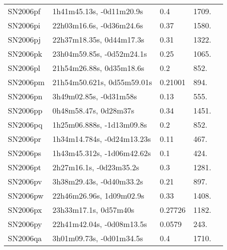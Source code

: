 \begin{longtable}{lllll}
         SN2006pf &       1h41m45.13s, -0d11m20.9s &      0.4 &          1709. &    \citet{2006IAUC.8782A...1M} \\
         SN2006pi &       22h03m16.6s, -0d36m24.6s &     0.37 &          1580. &    \citet{2006IAUC.8782A...1M} \\
         SN2006pj &       22h37m18.35s, 0d44m17.3s &     0.31 &          1322. &    \citet{2006IAUC.8782A...1M} \\
         SN2006pk &      23h04m59.85s, -0d52m24.1s &     0.25 &          1065. &    \citet{2006IAUC.8782A...1M} \\
         SN2006pl &       21h54m26.88s, 0d35m18.6s &      0.2 &           852. &    \citet{2006IAUC.8782A...1M} \\
         SN2006pm &     21h54m50.621s, 0d55m59.01s &  0.21001 &           894. &    \citet{2016SDSSD.C...0000:} \\
         SN2006pn &         3h49m02.85s, -0d31m58s &     0.13 &           555. &    \citet{2006IAUC.8782A...1M} \\
         SN2006pp &          0h48m58.47s, 0d28m37s &     0.34 &          1451. &    \citet{2006IAUC.8782A...1M} \\
         SN2006pq &      1h25m06.888s, -1d13m09.8s &      0.2 &           852. &    \citet{2006IAUC.8782A...1M} \\
         SN2006pr &     1h34m14.784s, -0d24m13.23s &     0.11 &           467. &    \citet{2006IAUC.8782A...1M} \\
         SN2006ps &     1h43m45.312s, -1d06m42.62s &      0.1 &           424. &    \citet{2006IAUC.8782A...1M} \\
         SN2006pt &        2h27m16.1s, -0d23m35.2s &      0.3 &          1281. &    \citet{2006IAUC.8782A...1M} \\
         SN2006pv &       3h38m29.43s, -0d40m33.2s &     0.21 &           897. &    \citet{2006IAUC.8782A...1M} \\
         SN2006pw &       22h46m26.96s, 1d09m02.9s &     0.33 &          1408. &    \citet{2006IAUC.8782A...1M} \\
         SN2006px &          23h33m17.1s, 0d57m40s &  0.27726 &          1182. &    \citet{2016SDSSD.C...0000:} \\
         SN2006py &      22h41m42.04s, -0d08m13.5s &   0.0579 &           243. &    \citet{2004SDSS2.C...0000:} \\
         SN2006qa &       3h01m09.73s, -0d01m34.5s &      0.4 &          1710. &    \citet{2006IAUC.8782A...1M} \\

\end{longtable}
